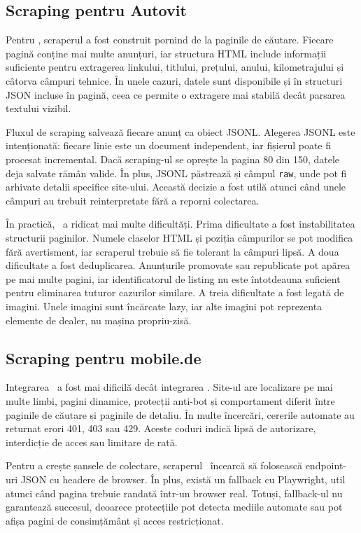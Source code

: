\subsection{Scraping pentru Autovit}
\label{sec:data-autovit}

Pentru \autovit, scraperul a fost construit pornind de la paginile de căutare. Fiecare pagină conține mai multe anunțuri, iar structura HTML include informații suficiente pentru extragerea linkului, titlului, prețului, anului, kilometrajului și câtorva câmpuri tehnice. În unele cazuri, datele sunt disponibile și în structuri JSON incluse în pagină, ceea ce permite o extragere mai stabilă decât parsarea textului vizibil.

Fluxul de scraping salvează fiecare anunț ca obiect JSONL. Alegerea JSONL este intenționată: fiecare linie este un document independent, iar fișierul poate fi procesat incremental. Dacă scraping-ul se oprește la pagina 80 din 150, datele deja salvate rămân valide. În plus, JSONL păstrează și câmpul \texttt{raw}, unde pot fi arhivate detalii specifice site-ului. Această decizie a fost utilă atunci când unele câmpuri au trebuit reinterpretate fără a reporni colectarea.

În practică, \autovit\ a ridicat mai multe dificultăți. Prima dificultate a fost instabilitatea structurii paginilor. Numele claselor HTML și poziția câmpurilor se pot modifica fără avertisment, iar scraperul trebuie să fie tolerant la câmpuri lipsă. A doua dificultate a fost deduplicarea. Anunțurile promovate sau republicate pot apărea pe mai multe pagini, iar identificatorul de listing nu este întotdeauna suficient pentru eliminarea tuturor cazurilor similare. A treia dificultate a fost legată de imagini. Unele imagini sunt încărcate lazy, iar alte imagini pot reprezenta elemente de dealer, nu mașina propriu-zisă.

\subsection{Scraping pentru mobile.de}
\label{sec:data-mobilede}

Integrarea \mobilede\ a fost mai dificilă decât integrarea \autovit. Site-ul are localizare pe mai multe limbi, pagini dinamice, protecții anti-bot și comportament diferit între paginile de căutare și paginile de detaliu. În multe încercări, cererile automate au returnat erori 401, 403 sau 429. Aceste coduri indică lipsă de autorizare, interdicție de acces sau limitare de rată.

Pentru a crește șansele de colectare, scraperul \mobilede\ încearcă să folosească endpoint-uri JSON cu headere de browser. În plus, există un fallback cu Playwright, util atunci când pagina trebuie randată într-un browser real. Totuși, fallback-ul nu garantează succesul, deoarece protecțiile pot detecta mediile automate sau pot afișa pagini de consimțământ și acces restricționat.

